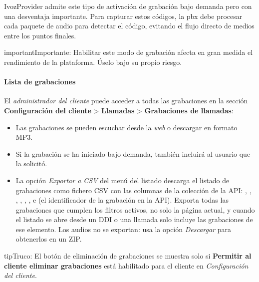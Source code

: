 \documentclass[letterpaper,10pt,spanish]{sphinxmanual}
\begin{document}
IvozProvider admite este tipo de activación de grabación bajo demanda pero con una desventaja importante. Para capturar estos códigos, la pbx debe procesar cada paquete de audio para detectar el código, evitando el flujo directo de medios entre los puntos finales.

\begin{notice}{important}{Importante:}
Habilitar este modo de grabación afecta en gran medida el rendimiento de la plataforma. Úselo bajo su propio riesgo.
\end{notice}


\paragraph{Lista de grabaciones}
\label{administration_portal/client/retail/calls/call_recordings:recordings-list}
El \emph{administrador del cliente} puede acceder a todas las grabaciones en la sección \textbf{Configuración del cliente} \textgreater{} \textbf{Llamadas} \textgreater{} \textbf{Grabaciones de llamadas}:
\begin{itemize}
\item {} 
Las grabaciones se pueden escuchar desde la \emph{web} o descargar en formato MP3.

\item {} 
Si la grabación se ha iniciado bajo demanda, también incluirá al usuario que la solicitó.

\item {} 
La opción \emph{Exportar a CSV} del menú del listado descarga el listado de grabaciones como fichero CSV con las columnas de la colección de la API: , , , , , ,  e  (el identificador de la grabación en la API). Exporta todas las grabaciones que cumplen los filtros activos, no solo la página actual, y cuando el listado se abre desde un DDI o una llamada solo incluye las grabaciones de ese elemento. Los audios no se exportan: usa la opción \emph{Descargar} para obtenerlos en un ZIP.

\end{itemize}

\begin{notice}{tip}{Truco:}
El botón de eliminación de grabaciones se muestra solo si \textbf{Permitir al cliente eliminar grabaciones} está habilitado para el cliente en \emph{Configuración del cliente}.
\end{notice}
\end{document}

